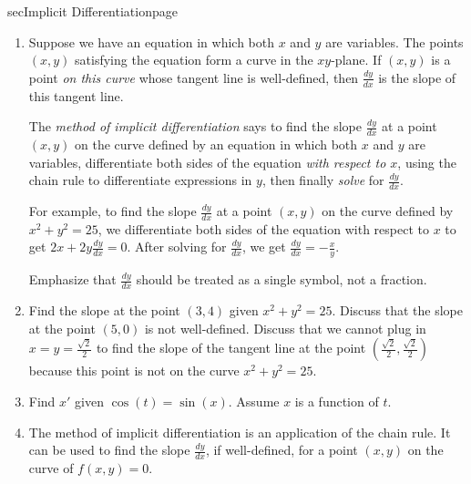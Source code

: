 \documentclass[../main]{subfiles}
\begin{document}
\begin{outline}{sec}{Implicit Differentiation}{page}
\begin{enumerate}
    \item Suppose we have an equation in which both \(x\) and \(y\) are variables. The points \((x,y)\) satisfying the equation form a curve in the \(xy\)-plane. If \((x,y)\) is a point \emph{on this curve} whose tangent line is well-defined, then \(\frac{dy}{dx}\) is the slope of this tangent line.

      \begin{mdframed}[style=simple]
        The \emph{method of implicit differentiation} says to find the slope \(\frac{dy}{dx}\) at a point \((x,y)\) on the curve defined by an equation in which both \(x\) and \(y\) are variables, differentiate both sides of the equation \emph{with respect to \(x\)}, using the chain rule to differentiate expressions in \(y\), then finally \emph{solve} for \(\frac{dy}{dx}\).

        \medskip
        For example, to find the slope \(\frac{dy}{dx}\) at a point \((x,y)\) on the curve defined by \(x^{2} + y^{2} = 25\), we differentiate both sides of the equation with respect to \(x\) to get \(2x + 2y \frac{dy}{dx} = 0\). After solving for \(\frac{dy}{dx}\), we get \(\frac{dy}{dx} = -\frac{x}{y}\).
      \end{mdframed}
        
      Emphasize that \(\frac{dy}{dx}\) should be treated as a single symbol, not a fraction.

    \item Find the slope at the point \((3,4)\) given \(x^{2} + y^{2} = 25\).  Discuss that the slope at the point \((5,0)\) is not well-defined.  Discuss that we cannot plug in \(x = y = \frac{\sqrt{2}}{2}\) to find the slope of the tangent line at the point \((\frac{\sqrt{2}}{2}, \frac{\sqrt{2}}{2})\) because this point is not on the curve \(x^{2} + y^{2} = 25\).
    \item Find \(x'\) given \(\cos(t) = \sin(x)\). Assume \(x\) is a function of \(t\).  
      
    \item {The method of implicit differentiation is an application of the chain rule.  It can be used to find the slope \(\frac{dy}{dx}\), if well-defined, for a point \((x,y)\) on the curve of \(f(x,y) = 0\).}
\end{enumerate}
\end{outline}

 
\end{document}
